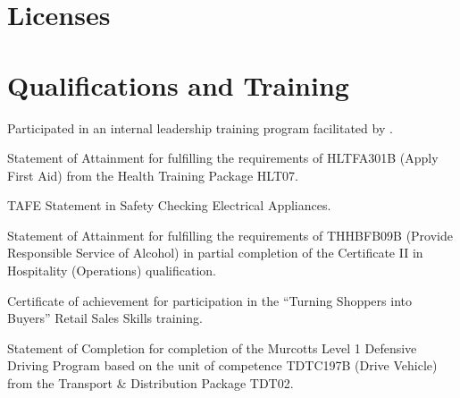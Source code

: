 \documentclass[10pt]{article}
\begin{document}
\section*{Licenses}
\begin{licenses}
\end{licenses}

\section*{Qualifications and Training}
\begin{qualifications}

{Participated in an internal leadership training program facilitated by 
.}

{Statement of Attainment for fulfilling the requirements of HLTFA301B (Apply 
First Aid) from the Health Training Package HLT07.}

{TAFE Statement in Safety Checking Electrical Appliances.}

{Statement of Attainment for fulfilling the requirements of THHBFB09B (Provide 
Responsible Service of Alcohol) in partial completion of the Certificate II in 
Hospitality (Operations) qualification.}

{Certificate of achievement for participation in the  ``Turning 
Shoppers into Buyers'' Retail Sales Skills training.}

{Statement of Completion for completion of the Murcotts Level 1 Defensive 
Driving Program based on the unit of competence TDTC197B (Drive Vehicle) from 
the Transport \& Distribution Package TDT02.}

\end{qualifications}
\end{document}
